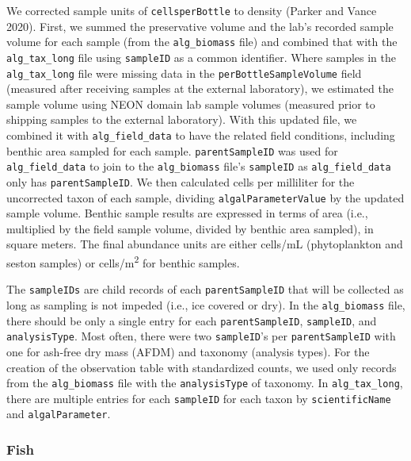 \documentclass[
  12pt,
]{article}
\begin{document}
We corrected sample units of \texttt{cellsperBottle} to density (Parker and Vance 2020). First, we summed the preservative volume and the lab's recorded sample volume for each sample (from the \texttt{alg\_biomass} file) and combined that with the \texttt{alg\_tax\_long} file using \texttt{sampleID} as a common identifier. Where samples in the \texttt{alg\_tax\_long} file were missing data in the \texttt{perBottleSampleVolume} field (measured after receiving samples at the external laboratory), we estimated the sample volume using NEON domain lab sample volumes (measured prior to shipping samples to the external laboratory). With this updated file, we combined it with \texttt{alg\_field\_data} to have the related field conditions, including benthic area sampled for each sample. \texttt{parentSampleID} was used for \texttt{alg\_field\_data} to join to the \texttt{alg\_biomass} file's \texttt{sampleID} as \texttt{alg\_field\_data} only has \texttt{parentSampleID}. We then calculated cells per milliliter for the uncorrected taxon of each sample, dividing \texttt{algalParameterValue} by the updated sample volume. Benthic sample results are expressed in terms of area (i.e., multiplied by the field sample volume, divided by benthic area sampled), in square meters. The final abundance units are either cells/mL (phytoplankton and seston samples) or cells/m\textsuperscript{2} for benthic samples.

The \texttt{sampleIDs} are child records of each \texttt{parentSampleID} that will be collected as long as sampling is not impeded (i.e., ice covered or dry). In the \texttt{alg\_biomass} file, there should be only a single entry for each \texttt{parentSampleID}, \texttt{sampleID}, and \texttt{analysisType}. Most often, there were two \texttt{sampleID}'s per \texttt{parentSampleID} with one for ash-free dry mass (AFDM) and taxonomy (analysis types). For the creation of the observation table with standardized counts, we used only records from the \texttt{alg\_biomass} file with the \texttt{analysisType} of taxonomy. In \texttt{alg\_tax\_long}, there are multiple entries for each \texttt{sampleID} for each taxon by \texttt{scientificName} and \texttt{algalParameter}.

\hypertarget{fish}{%
\subsubsection{Fish}\label{fish}}
\end{document}
